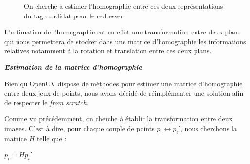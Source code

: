         \begin{figure}[h]
            \centering
            \hspace{.02\textwidth}
            \caption{On cherche a estimer l'homographie entre ces deux représentations du tag candidat pour le redresser}
        \end{figure}

        L'estimation de l'homographie est en effet une transformation entre deux plans qui nous permettera de stocker dans une matrice d'homographie les informations relatives notamment à la rotation et translation entre ces deux plans.

        \textbf{\textit{Estimation de la matrice d'homographie}}

        Bien qu'OpenCV dispose de méthodes pour estimer une matrice d'homographie entre deux jeux de points, nous avons décidé de réimplémenter une solution afin de respecter le \emph{from scratch}.

        Comme vu précédemment, on cherche à établir la transformation entre deux images. C'est à dire, pour chaque couple de points $p_i \leftrightarrow p_{i}' $, nous cherchons la matrice $H$ telle que :
    
        \begin{center}
            $ p_i = Hp_i' $            
        \end{center}

